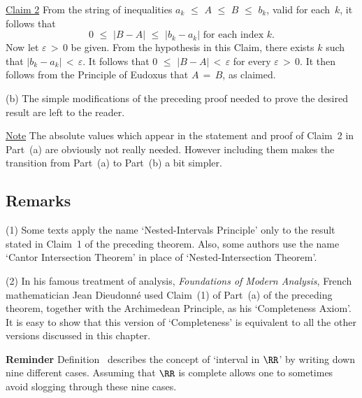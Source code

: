         \underline{Claim 2} From the string of inequalities $a_{k}\,\,{\leq}\,\,A\,\,{\leq}\,\,B\,\,{\leq}\,\,b_{k}$, valid for each~$k$,
    it follows that
        \begin{displaymath}
        0\,\,{\leq}\,\,|B-A|\,\,{\leq}\,\,|b_{k}-a_{k}| \mbox{ for each index $k$}.
        \end{displaymath}
    Now let ${\varepsilon}\,>\,0$ be given. From the hypothesis in this Claim, there exists $k$ such that $|b_{k}-a_{k}|\,<\,{\varepsilon}$.
    It follows that $0\,\,{\leq}\,\,|B-A|\,<\,{\varepsilon}$ for every ${\varepsilon}\,>\,0$.
    It then follows from the Principle of Eudoxus that $A \,=\, B$, as claimed.

\V

        (b) The simple modifications of the preceding proof needed to prove the desired result are left to the reader.

\V

        \underline{Note} The absolute values which appear in the statement and proof of Claim~2 in Part~(a) are obviously not really needed.
    However including them makes the transition from Part~(a) to Part~(b) a bit simpler.

\VV

            \subsection{\small{\bf Remarks}}
            \label{ThmC20.45}

\V

\hspace*{\parindent}(1)  Some texts apply the name `Nested-Intervals Principle' only to the result stated in Claim~1 of the preceding theorem.
    Also, some authors use the name `Cantor Intersection Theorem' in place of `Nested-Intersection Theorem'.

\V

        (2) In his famous treatment of analysis, {\em Foundations of Modern Analysis},
    French mathematician Jean Dieudonn\'{e} used Claim~(1) of Part~(a) of the preceding theorem, together with the Archimedean Principle, as his `Completeness Axiom'.
    It is easy to show that this version of `Completeness' is equivalent to all the other versions discussed in this chapter.


\VV


        {\bf Reminder} Definition~ describes the concept of `interval in ${\RR}$' by writing down nine different cases.
    Assuming that ${\RR}$ is complete allows one to sometimes avoid slogging through these nine cases.

